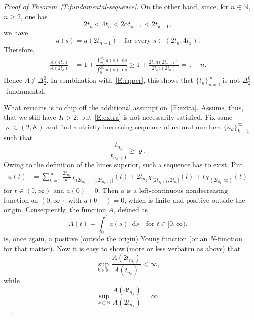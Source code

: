 \documentclass[nointlimits]{amsart}
\numberwithin{equation}{section}
\theoremstyle{plain}
\theoremstyle{definition}
\newcommand{\N}{\mathbb{N}}
\newcommand{\DTwo}{\Delta_2}
\newcommand{\DTwoZ}{\DTwo^0}
\newcommand*\dd{\mathop{}\!\mathrm{d}}
\begin{document}
\begin{proof}[Proof of Theorem~\ref{T:fundamental-sequence}]
On the other hand, since, for $n\in\N$, $n\ge2$, one has
\begin{equation*}
    2t_{n} <4t_{n}<2\alpha t_{n-1}<2 t_{n-1},
\end{equation*}
we have
\begin{equation*}
    a(s)=a(2t_{n-1})
    \quad\text{for every
    $s\in(2t_n, 4t_n)$.}
\end{equation*}
Therefore,
\begin{align*}
    \frac{A(4t_n)}{A(2t_n)}
    &=
    1+\frac{\int_{2t_n}^{4t_n}a(s)\dd s}{\int_{0}^{2t_n}a(s)\dd s}
        \ge
    1+\frac{2t_na(2t_{n-1})}{2t_na(2t_n)}=1+n.
\end{align*}
Hence $A\notin\DTwoZ$. In combination with~\eqref{E:upper}, this shows that $\{t_n\}_{n=1}^\infty$ is not $\DTwoZ$-fundamental.

What remains is to chip off the additional assumption~\eqref{E:extra}. Assume, thus, that we still have $K>2$, but~\eqref{E:extra} is not necessarily satisfied. 
Fix some $\varrho\in(2,K)$ and find a strictly increasing sequence of natural numbers $\{n_k\}_{k=1}^\infty$ such that
\begin{equation}
    \label{E:limsup-restricted}
    \frac{t_{n_k}}{t_{n_k+1}}\ge\varrho.
\end{equation}
Owing to the definition of the limes superior, such a sequence has to exist. Put
\begin{align*}
    a(t)&=
    \sum_{k=1}^{\infty}
    \frac{2t_{n_1}}{k!}
    \chi_{(2t_{n_{k+1}+1}
    ,2t_{n_k+1}]}(t)
    +2t_{n_1}
    \chi_{(2t_{n_1+1},2t_{n_1}]}(t)
    +t\chi_{(2t_{n_1},\infty)}(t)
\end{align*}
for $t\in(0,\infty)$ 
and $a(0)=0$. Then $a$ is a left-continuous nondecreasing function on $(0,\infty)$ with $a(0+)=0$, which is finite and positive outside the origin. Consequently, the function $A$, defined as
\begin{equation*}
    A(t)=
    \int_{0}^{t}a(s)\dd s
    \quad\text{for $t\in[0,\infty)$,}
\end{equation*}
is, once again, a positive (outside the origin) Young function (or an $N$-function for that matter). Now it is easy to show (more or less verbatim as above) that 
\begin{equation*}
    \sup_{k\in\N}
    \frac{A(2t_{n_k})}{A(t_{n_k})}
    <\infty,
\end{equation*}
while
\begin{equation*}
    \sup_{k\in\N}
    \frac{A(4t_{n_k})}{A(2t_{n_k})}
    =\infty.
\end{equation*}

\end{proof}
\end{document}
